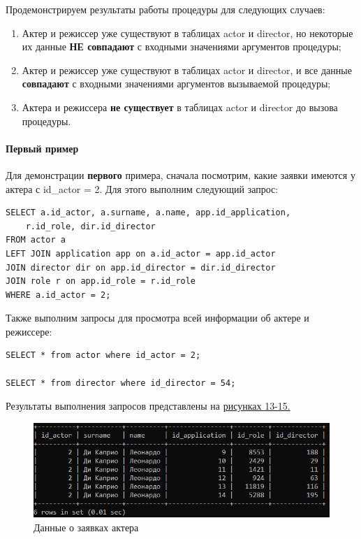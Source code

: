 \documentclass[11pt,a4paper,final]{article} %
\begin{document}
Продемонстрируем результаты работы процедуры для следующих случаев:
\begin{enumerate}
	\item Актер и режиссер уже существуют в таблицах actor и director, но некоторые их данные \textbf{НЕ совпадают} с входными значениями аргументов процедуры;
	\item Актер и режиссер уже существуют в таблицах actor и director, и все данные \\ \textbf{совпадают} с входными значениями аргументов вызываемой процедуры;
	\item Актера и режиссера \textbf{не существует} в таблицах actor и director до вызова процедуры.
\end{enumerate}

\paragraph{Первый пример}

Для демонстрации \textbf{первого} примера, сначала посмотрим, какие заявки имеются у актера с id\_actor = 2. Для этого выполним следующий запрос: 

\begin{lstlisting}
SELECT a.id_actor, a.surname, a.name, app.id_application, 
	r.id_role, dir.id_director
FROM actor a
LEFT JOIN application app on a.id_actor = app.id_actor
JOIN director dir on app.id_director = dir.id_director
JOIN role r on app.id_role = r.id_role
WHERE a.id_actor = 2;
\end{lstlisting}

Также выполним запросы для просмотра всей информации об актере и режиссере:
\begin{lstlisting}
SELECT * from actor where id_actor = 2;

SELECT * from director where id_director = 54;
\end{lstlisting}

Результаты выполнения запросов представлены на \hyperref[fig:pic13]{рисунках 13-15.}
\newpage
\begin{figure}[H]
	\centering
	\includegraphics[width=0.9\linewidth]{pic13.png}
	\caption{Данные о заявках актера}
	\label{fig:pic13}
\end{figure}
\end{document}
